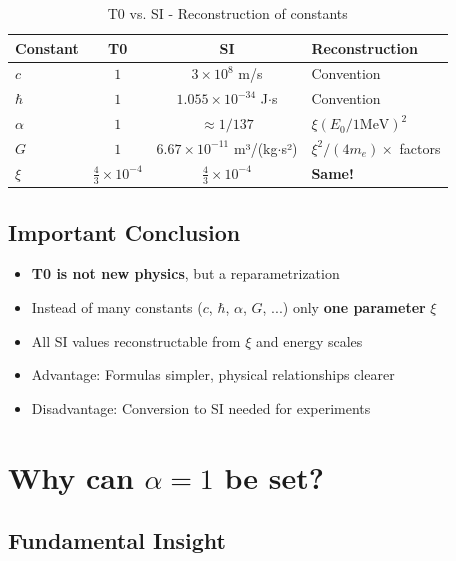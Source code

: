 	\begin{table}[h]
		\centering
		\begin{tabular}{|l|c|c|l|}
			\hline
			\textbf{Constant} & \textbf{T0} & \textbf{SI} & \textbf{Reconstruction} \\
			\hline
			$c$ & $1$ & $3 \times 10^8$ m/s & Convention \\
			$\hbar$ & $1$ & $1.055 \times 10^{-34}$ J$\cdot$s & Convention \\
			$\alpha$ & $1$ & $\approx 1/137$ & $\xi(E_0/1\text{MeV})^2$ \\
			$G$ & $1$ & $6.67 \times 10^{-11}$ m³/(kg$\cdot$s²) & $\xi^2/(4m_e) \times$ factors \\
			$\xi$ & $\frac{4}{3} \times 10^{-4}$ & $\frac{4}{3} \times 10^{-4}$ & \textbf{Same!} \\
			\hline
		\end{tabular}
		\caption{T0 vs. SI - Reconstruction of constants}
	\end{table}
	
	\subsection{Important Conclusion}
	
	\begin{itemize}
		\item \textbf{T0 is not new physics}, but a reparametrization
		
		\item Instead of many constants ($c$, $\hbar$, $\alpha$, $G$, ...) only \textbf{one parameter} $\xi$
		
		\item All SI values reconstructable from $\xi$ and energy scales
		
		\item Advantage: Formulas simpler, physical relationships clearer
		
		\item Disadvantage: Conversion to SI needed for experiments
	\end{itemize}
	
	\section{Why can $\alpha = 1$ be set?}
	
	\subsection{Fundamental Insight}
	
